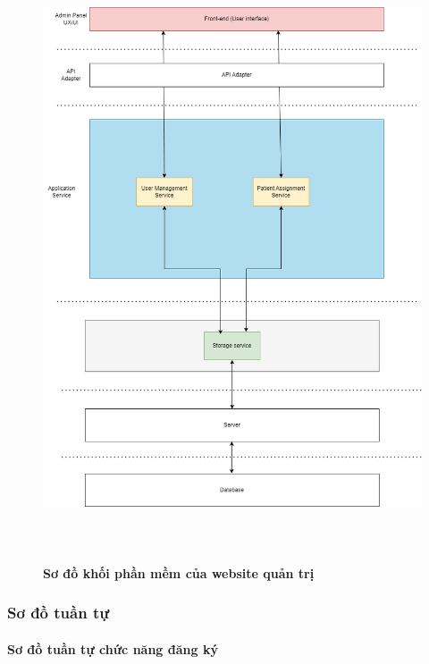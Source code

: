 \begin{figure}[H]
  \centering
  \includegraphics[width=16cm,height=18cm]{Images/system/fmECG_architecture-Admin.drawio.png}
  \caption[Sơ đồ khối phần mềm của website quản trị]{\bfseries \fontsize{12pt}{0pt}\selectfont Sơ đồ khối phần mềm của website quản trị}
  \label{fmECG_architecture-Admin} %
\end{figure}

\subsubsection{Sơ đồ tuần tự}

\paragraph{Sơ đồ tuần tự chức năng đăng ký}
\mbox{}

